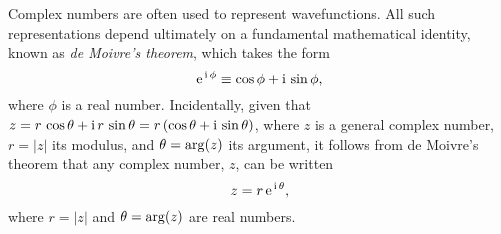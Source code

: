 Complex numbers are often used to represent wavefunctions. All such representations  depend ultimately on a fundamental mathematical identity, known as
{\em de Moivre's theorem}, which takes the form
\begin{equation}
{\rm e}^{\,{\rm i}\,\phi} \equiv \cos\phi + {\rm i}\,\sin\phi,
\end{equation}
where $\phi$ is a  real number. Incidentally, given that $z=r\,\cos\theta + {\rm i}\,r\,\sin\theta= r\,(\cos\theta+{\rm i}\,\sin\theta)$, where $z$ is a general
complex number, $r=|z|$  its modulus, and $\theta={\rm arg}(z)$ its argument, it follows from de Moivre's theorem that any
complex number, $z$, can be written
\begin{equation}
z = r\,{\rm e}^{\,{\rm i}\,\theta},
\end{equation}
where $r=|z|$ and $\theta={\rm arg}(z)$ are real numbers. 

